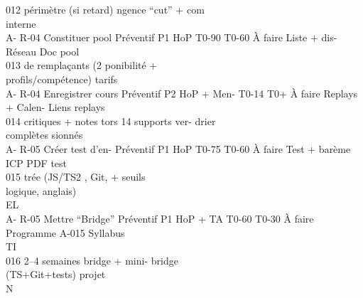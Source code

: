 \documentclass[12pt,landscape,a4paper]{article}
\begin{document}
012         périmètre (si retard) ngence                                            “cut” + com\\
interne\\
A- R-04    Constituer pool       Préventif P1    HoP          T0-90 T0-60 À faire   Liste + dis-  Réseau Doc pool\\
013        de remplaçants (2                                                        ponibilité +\\
profils/compétence)                                                      tarifs\\
A- R-04    Enregistrer cours     Préventif P2    HoP + Men- T0-14 T0+     À faire   Replays +     Calen-  Liens replays\\
014        critiques + notes                     tors             14                supports ver- drier\\
complètes                                                                sionnés\\
A- R-05    Créer test d’en-      Préventif P1    HoP          T0-75 T0-60 À faire   Test + barème ICP     PDF test\\
015        trée (JS/TS2 , Git,                                                      + seuils\\
logique, anglais)\\
\vspace{0.5em}
\vspace{0.5em}
\vspace{0.5em}
\vspace{0.5em}
EL\\
A- R-05    Mettre “Bridge”       Préventif P1    HoP + TA     T0-60 T0-30 À faire   Programme      A-015       Syllabus\\
\vspace{0.5em}
\vspace{0.5em}
\vspace{0.5em}
\vspace{0.5em}
TI\\
016        2–4 semaines                                                             bridge + mini-             bridge\\
(TS+Git+tests)                                                           projet\\
\vspace{0.5em}
\vspace{0.5em}
\vspace{0.5em}
\vspace{0.5em}
N\\
\end{document}
